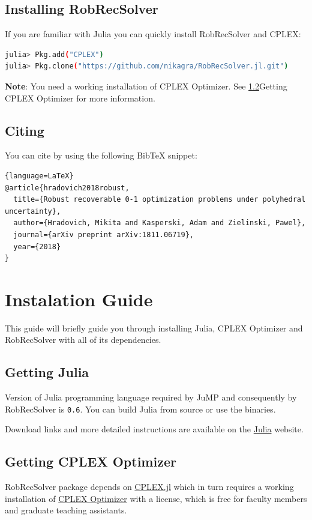 \subsection{Installing RobRecSolver}
If you are familiar with Julia you can quickly install RobRecSolver and CPLEX:
\begin{lstlisting}[language=Bash]
julia> Pkg.add("CPLEX")
julia> Pkg.clone("https://github.com/nikagra/RobRecSolver.jl.git")
\end{lstlisting}

\textbf{Note}: You need a working installation of CPLEX Optimizer. See \ref{sec:getting_cplex}{Getting CPLEX Optimizer} for more information.

\subsection{Citing}
You can cite \cite{DBLP:journals/corr/abs-1811-06719} by using the following BibTeX snippet:
\begin{lstlisting}{language=LaTeX}
@article{hradovich2018robust,
  title={Robust recoverable 0-1 optimization problems under polyhedral uncertainty},
  author={Hradovich, Mikita and Kasperski, Adam and Zielinski, Pawel},
  journal={arXiv preprint arXiv:1811.06719},
  year={2018}
}   
\end{lstlisting}

\section{Instalation Guide}
This guide will briefly guide you through installing Julia, CPLEX Optimizer and RobRecSolver with all of its dependencies.

\subsection{Getting Julia}
Version of Julia programming language required by JuMP and consequently by RobRecSolver is \texttt{0.6}. You can build Julia from source or use the binaries.

Download links and more detailed instructions are available on the \href{https://julialang.org/downloads/}{Julia} website.

\subsection{Getting CPLEX Optimizer}
\label{sec:getting_cplex}
RobRecSolver package depends on \href{https://github.com/JuliaOpt/CPLEX.jl}{CPLEX.jl} which in turn requires a working installation of \href{https://www.ibm.com/analytics/cplex-optimizer}{CPLEX Optimizer} with a license, which is free for faculty members and graduate teaching assistants.

